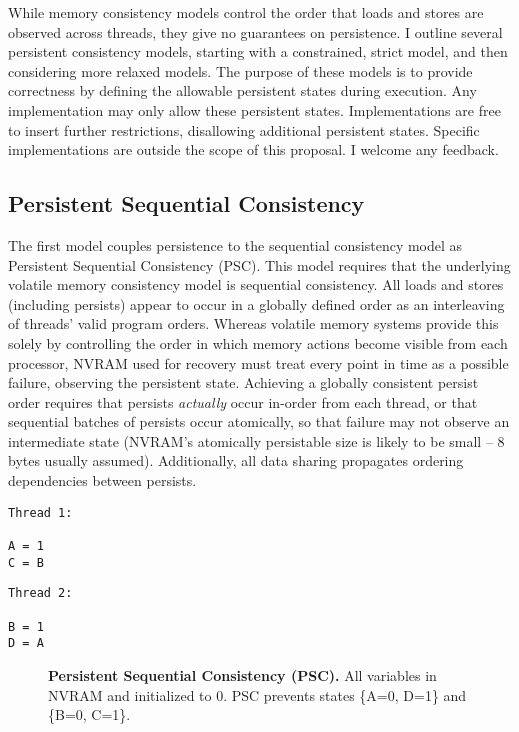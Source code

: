 While memory consistency models control the order that loads and stores are observed across threads, they give no guarantees on persistence.
I outline several persistent consistency models, starting with a constrained, strict model, and then considering more relaxed models.
The purpose of these models is to provide correctness by defining the allowable persistent states during execution.
Any implementation may only allow these persistent states.
Implementations are free to insert further restrictions, disallowing additional persistent states.
Specific implementations are outside the scope of this proposal.
I welcome any feedback.

\subsection{Persistent Sequential Consistency}
\label{sec:PMC:PersistenceModels:PSC}

The first model couples persistence to the sequential consistency model as Persistent Sequential Consistency (PSC).
This model requires that the underlying volatile memory consistency model is sequential consistency.
All loads and stores (including persists) appear to occur in a globally defined order as an interleaving of threads' valid program orders.
Whereas volatile memory systems provide this solely by controlling the order in which memory actions become visible from each processor, NVRAM used for recovery must treat every point in time as a possible failure, observing the persistent state.
Achieving a globally consistent persist order requires that persists \emph{actually} occur in-order from each thread, or that sequential batches of persists occur atomically, so that failure may not observe an intermediate state (NVRAM's atomically persistable size is likely to be small -- 8 bytes usually assumed).
Additionally, all data sharing propagates ordering dependencies between persists.

{
\singlespacing
\newsavebox{\PSCThreadOne}
\begin{lrbox}{\PSCThreadOne}
  \begin{lstlisting}
Thread 1:

A = 1
C = B
  \end{lstlisting}
\end{lrbox}

\newsavebox{\PSCThreadTwo}
\begin{lrbox}{\PSCThreadTwo}
  \begin{lstlisting}
Thread 2:

B = 1
D = A
  \end{lstlisting}
\end{lrbox}

\begin{figure}[]
\centering
\subfigure{ \usebox{\PSCThreadOne} }
\hspace{1 in}
\subfigure{ \usebox{\PSCThreadTwo} }
\caption{\textbf{Persistent Sequential Consistency (PSC).} All variables in NVRAM and initialized to 0.  PSC prevents states \{A=0, D=1\} and \{B=0, C=1\}.}
\label{fig:PSC}
\end{figure}
}


